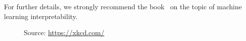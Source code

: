   \par For further details, we strongly recommend the book~\citep{molnar2019} on the topic of machine learning interpretability.

  \begin{figure}[!htbp]
    \centering
    \caption{Source: \url{https://xkcd.com/}}
    \label{fig:current_ml_comic}
  \end{figure}


